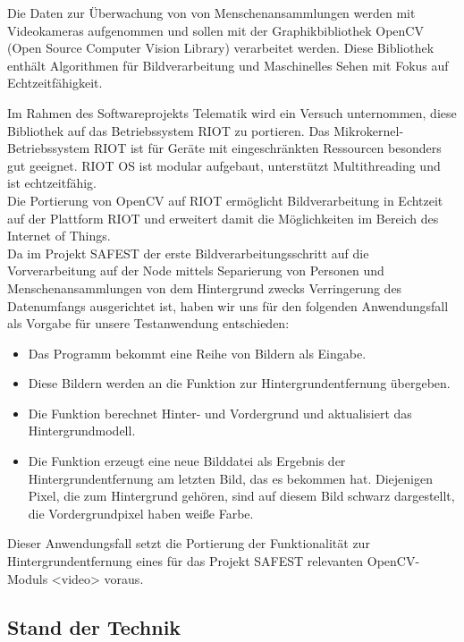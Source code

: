 \documentclass[10pt,a4paper]{article}
\begin{document}
Die Daten zur Überwachung von von Menschenansammlungen werden mit Videokameras aufgenommen und sollen mit der Graphikbibliothek OpenCV (Open Source Computer Vision Library) verarbeitet werden. Diese Bibliothek enthält Algorithmen für Bildverarbeitung und Maschinelles Sehen mit Fokus auf Echtzeitfähigkeit. 

Im Rahmen des Softwareprojekts Telematik wird ein Versuch unternommen, diese Bibliothek auf das Betriebssystem RIOT zu portieren. Das Mikrokernel-Betriebssystem RIOT ist für Geräte mit eingeschränkten Ressourcen besonders gut geeignet. RIOT OS ist modular aufgebaut, unterstützt Multithreading und ist echtzeitfähig. \\

Die Portierung von OpenCV auf RIOT ermöglicht Bildverarbeitung in Echtzeit auf der Plattform RIOT und erweitert damit die Möglichkeiten im Bereich des Internet of Things. \\

Da im Projekt SAFEST der erste Bildverarbeitungsschritt auf die Vorverarbeitung auf der Node mittels Separierung von Personen und Menschenansammlungen von dem Hintergrund zwecks Verringerung des Datenumfangs ausgerichtet ist, haben wir uns für den folgenden Anwendungsfall als Vorgabe für unsere Testanwendung entschieden: 

\begin{itemize}
\item Das Programm bekommt eine Reihe von Bildern als Eingabe.
\item Diese Bildern werden an die Funktion zur Hintergrundentfernung übergeben. 
\item Die Funktion berechnet Hinter- und Vordergrund und aktualisiert das Hintergrundmodell.
\item Die Funktion erzeugt eine neue Bilddatei als Ergebnis der Hintergrundentfernung am letzten Bild, das es bekommen hat. Diejenigen Pixel, die zum Hintergrund gehören, sind auf diesem Bild schwarz dargestellt, die Vordergrundpixel haben weiße Farbe.
\end{itemize}

Dieser Anwendungsfall setzt die Portierung der Funktionalität zur Hintergrundentfernung eines für das Projekt SAFEST relevanten OpenCV-Moduls <video> voraus.

\subsection{Stand der Technik}
\end{document}
